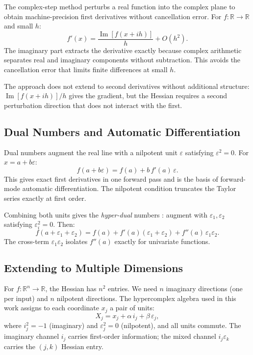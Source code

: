 \documentclass[11pt]{article}
\begin{document}
The complex-step method \citep{lyness1967,squire1998} perturbs a real function into
the complex plane to obtain machine-precision first derivatives without cancellation
error. For $f:\mathbb{R} \to \mathbb{R}$ and small $h$:
\[
  f'(x) = \frac{\operatorname{Im}[f(x + ih)]}{h} + O(h^2).
\]
The imaginary part extracts the derivative exactly because complex arithmetic
separates real and imaginary components without subtraction. This avoids the
cancellation error that limits finite differences at small $h$.

The approach does not extend to second derivatives without additional structure:
$\operatorname{Im}[f(x+ih)] / h$ gives the gradient, but the Hessian requires a
second perturbation direction that does not interact with the first.

\subsection{Dual Numbers and Automatic Differentiation}

Dual numbers augment the real line with a nilpotent unit $\varepsilon$ satisfying
$\varepsilon^2 = 0$. For $x = a + b\varepsilon$:
\[
  f(a + b\varepsilon) = f(a) + b\,f'(a)\,\varepsilon.
\]
This gives exact first derivatives in one forward pass and is the basis of
forward-mode automatic differentiation. The nilpotent condition truncates the Taylor
series exactly at first order.

Combining both units gives the \emph{hyper-dual} numbers
\citep{griewank2008}: augment with $\varepsilon_1, \varepsilon_2$ satisfying
$\varepsilon_i^2 = 0$. Then:
\[
  f(a + \varepsilon_1 + \varepsilon_2)
  = f(a) + f'(a)(\varepsilon_1 + \varepsilon_2) + f''(a)\,\varepsilon_1\varepsilon_2.
\]
The cross-term $\varepsilon_1\varepsilon_2$ isolates $f''(a)$ exactly for univariate
functions.

\subsection{Extending to Multiple Dimensions}

For $f:\mathbb{R}^n \to \mathbb{R}$, the Hessian has $n^2$ entries. We need $n$
imaginary directions (one per input) and $n$ nilpotent directions. The hypercomplex
algebra used in this work assigns to each coordinate $x_j$ a pair of units:
\[
  X_j = x_j + \alpha\,i_j + \beta\,\varepsilon_j,
\]
where $i_j^2 = -1$ (imaginary) and $\varepsilon_j^2 = 0$ (nilpotent), and all units
commute. The imaginary channel $i_j$ carries first-order information; the mixed
channel $i_j\varepsilon_k$ carries the $(j,k)$ Hessian entry.
\end{document}
